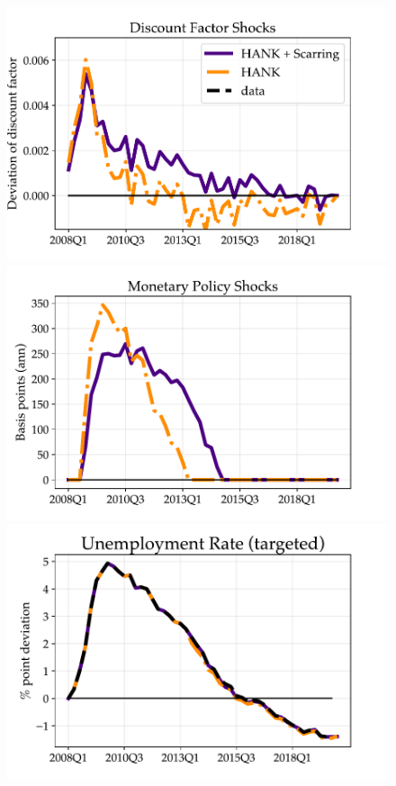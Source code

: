 \begin{figure}[t]
\begin{center}
\begin{minipage}{0.5\textwidth}
\includegraphics[scale=.5]{text/chapter1/Figures/GR_sim/DiscFacShks}
\end{minipage}\hspace*{\fill}
\begin{minipage}{0.5\textwidth}
\includegraphics[scale=.5]{text/chapter1/Figures/GR_sim/EVShocks}
\end{minipage}
\medskip
\begin{minipage}{0.5\textwidth}
\includegraphics[scale=.5]{text/chapter1/Figures/GR_sim/Urate_}

\end{minipage}
\end{center}
\end{figure}
